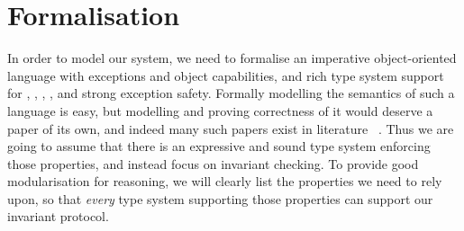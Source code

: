 \saveSpace
\section{Formalisation}
\label{s:meaning}
\saveSpace
In order to model our system, we need to formalise an imperative object-oriented language
with exceptions and object capabilities,  and rich type system
support for \Q@mut@, \Q@imm@, \Q@read@, \Q@capsule@, and strong exception safety.
Formally modelling the semantics of such a language is easy, but 
modelling and proving correctness of it would deserve a paper
of its own, and indeed many such papers exist in literature%
~\cite{ServettoEtAl13a,ServettoZucca15,GordonEtAl12,clebsch2015deny,JOT:issue_2011_01/article1}.
Thus we are going to assume that there is an expressive and sound type system enforcing
those properties, and instead focus on invariant checking.
To provide good modularisation for reasoning, 
we will clearly list the properties we need to rely upon, so that \emph{every} type
system supporting those properties can support our invariant protocol.

